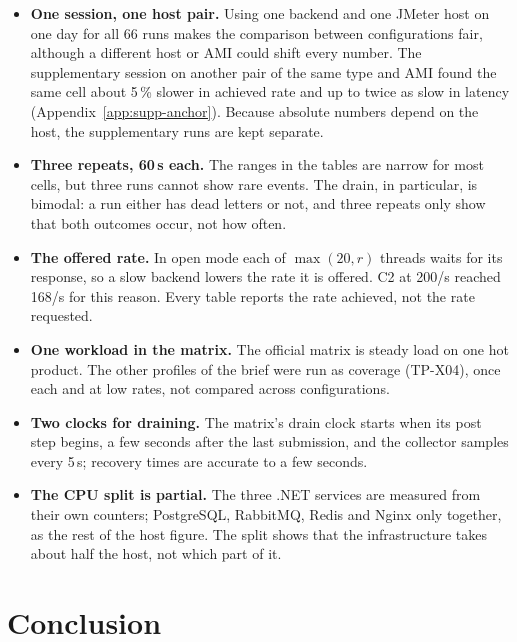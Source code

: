 \documentclass[a4paper]{report}
\begin{document}
\begin{itemize}
  \item \textbf{One session, one host pair.} Using one backend and one JMeter
    host on one day for all 66 runs makes the comparison between
    configurations fair, although a different host or AMI could shift every
    number. The supplementary session on another pair of the same type and AMI
    found the same cell about 5\,\% slower in achieved rate and up to twice as
    slow in latency (Appendix~\ref{app:supp-anchor}). Because absolute numbers
    depend on the host, the supplementary runs are kept separate.
  \item \textbf{Three repeats, 60\,s each.} The ranges in the tables are
    narrow for most cells, but three runs cannot show rare events. The drain,
    in particular, is bimodal: a run either has dead letters or not, and three
    repeats only show that both outcomes occur, not how often.
  \item \textbf{The offered rate.} In open mode each of $\max(20, r)$ threads
    waits for its response, so a slow backend lowers the rate it is offered.
    C2 at 200/s reached 168/s for this reason. Every table reports the rate
    achieved, not the rate requested.
  \item \textbf{One workload in the matrix.} The official matrix is steady
    load on one hot product. The other profiles of the brief were run as
    coverage (TP-X04), once each and at low rates, not compared across
    configurations.
  \item \textbf{Two clocks for draining.} The matrix's drain clock starts when
    its post step begins, a few seconds after the last submission, and the
    collector samples every 5\,s; recovery times are accurate to a few seconds.
  \item \textbf{The CPU split is partial.} The three .NET services are
    measured from their own counters; PostgreSQL, RabbitMQ, Redis and Nginx
    only together, as the rest of the host figure. The split shows that the
    infrastructure takes about half the host, not which part of it.
\end{itemize}

\chapter{Conclusion}
\label{sec:conclusion}
\end{document}
